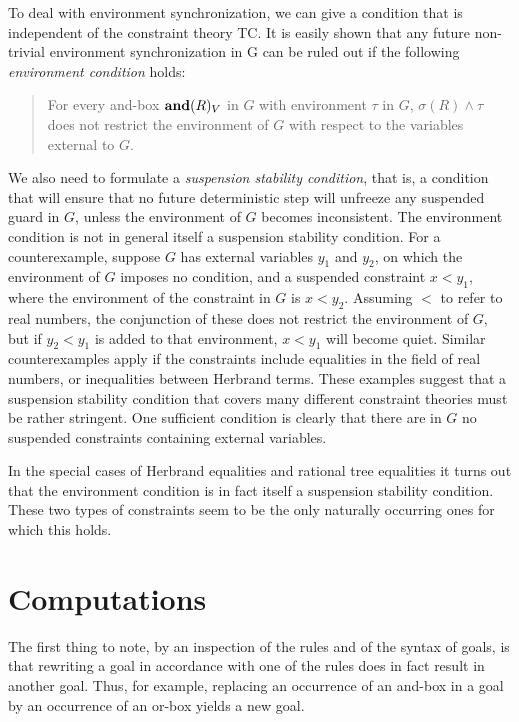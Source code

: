 To deal with environment synchronization, we can give a condition that
is independent of the constraint theory TC. It is easily shown that
any future non-trivial environment synchronization in G can be ruled
out if the following {\em environment condition} holds:
\begin{quote}
For every and-box $\mbox{\bf and}(R)_V$ in $G$ with environment $\tau$ in $G$,
$\sigma(R) \land \tau$ does not restrict the environment of $G$ with
respect to the variables external to $G$.
\end{quote}

We also need to formulate a {\em suspension stability condition}, that
is, a condition that will ensure that no future deterministic step
will unfreeze any suspended guard in $G$, unless the environment of
$G$ becomes inconsistent. The environment condition is not in general
itself a suspension stability condition. For a counterexample, suppose
$G$ has external variables $y_1$ and $y_2$, on which the environment
of $G$ imposes no condition, and a suspended constraint $x<y_1$, where
the environment of the constraint in $G$ is $x<y_2$.  Assuming $<$ to
refer to real numbers, the conjunction of these does not restrict the
environment of $G$, but if $y_2<y_1$ is added to that environment,
$x<y_1$ will become quiet.  Similar counterexamples apply if the
constraints include equalities in the field of real numbers, or
inequalities between Herbrand terms. These examples suggest that a
suspension stability condition that covers many different constraint
theories must be rather stringent. One sufficient condition is clearly
that there are in $G$ no suspended constraints containing external
variables.

In the special cases of Herbrand equalities and rational tree
equalities it turns out that the environment condition is in fact
itself a suspension stability condition. These two types of
constraints seem to be the only naturally occurring ones for which
this holds.

\section{Computations}

The first thing to note, by an inspection of the rules and of the
syntax of goals, is that rewriting a goal in accordance with one of
the rules does in fact result in another goal.  Thus, for example,
replacing an occurrence of an and-box in a goal by an occurrence of an
or-box yields a new goal.

